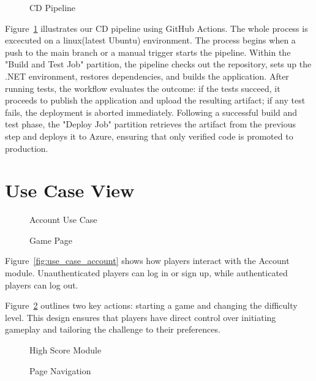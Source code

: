 \documentclass[11pt,a4paper]{article}
\newcommand{\inputdiagram}[1]{}
\newcommand{\textwidthdiagram}[2][1]{%
  \resizebox{#1\textwidth}{!}{\inputdiagram{#2}}%
}
\begin{document}
\begin{figure}[H]
    \centering
    \textwidthdiagram[0.8]{CD.tex}
    \caption{CD Pipeline}
    \label{fig:CD_pipeline}
\end{figure}
Figure~\ref{fig:CD_pipeline} illustrates our CD pipeline using GitHub
Actions. The whole process is excecuted on a linux(latest Ubuntu)
environment. The process begins when a push to the main branch or a manual
trigger starts the pipeline. Within the "Build and Test Job" partition,
the pipeline checks out the repository, sets up the .NET environment,
restores dependencies, and builds the application. After running tests,
the workflow evaluates the outcome: if the tests succeed, it proceeds to
publish the application and upload the resulting artifact; if any test fails,
the deployment is aborted immediately. Following a successful build and test
phase, the "Deploy Job" partition retrieves the artifact from the previous
step and deploys it to Azure, ensuring that only verified code is promoted
to production.

\section{Use Case View}

\begin{figure}[H]
    \centering
    \begin{minipage}[b]{0.48\textwidth}
        \centering
        \textwidthdiagram{use_case_account.tex}
        \caption{Account Use Case}
        \label{fig:use_case_account}
    \end{minipage}
    \hfil
    \begin{minipage}[b]{0.48\textwidth}
        \centering
        \textwidthdiagram{use_case_game_page.tex}
        \caption{Game Page}
        \label{fig:use_case_game_page}
    \end{minipage}
\end{figure}

Figure~\ref{fig:use_case_account} shows how players interact with the Account module.
Unauthenticated players can log in or sign up, while authenticated players can log out.

Figure~\ref{fig:use_case_game_page} outlines two key actions: starting a game and
changing the difficulty level. This design ensures that players have direct
control over initiating gameplay and tailoring the challenge to their
preferences.

\begin{figure}[H]
    \centering
    \begin{minipage}[b]{0.48\textwidth}
        \textwidthdiagram{use_case_high_score.tex}
        \caption{High Score Module}
        \label{fig:use_case_high_score}
    \end{minipage}
    \hfil
    \begin{minipage}[b]{0.48\textwidth}
        \centering
        \textwidthdiagram{use_case_navigation.tex}
        \caption{Page Navigation}
        \label{fig:use_case_navigation}
    \end{minipage}
\end{figure}
\end{document}
